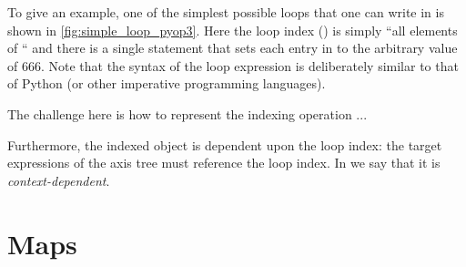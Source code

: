 \documentclass[thesis]{subfiles}
\begin{document}
To give an example, one of the simplest possible loops that one can write in  is shown in \cref{fig:simple_loop_pyop3}.
Here the loop index () is simply ``all elements of `` and there is a single statement that sets each entry in  to the arbitrary value of 666.
Note that the syntax of the loop expression is deliberately similar to that of Python (or other imperative programming languages).

The challenge here is how to represent the indexing operation ...


Furthermore, the indexed object is dependent upon the loop index: the target expressions of the axis tree must reference the loop index.
In  we say that it is \textit{context-dependent}.



\section{Maps}
\end{document}
